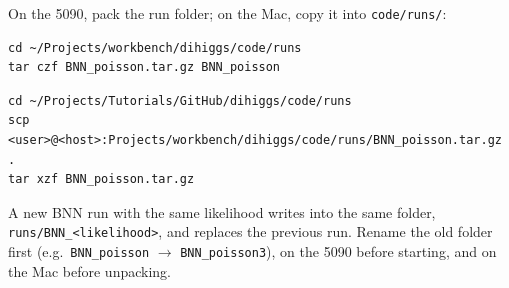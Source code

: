 \documentclass[11pt]{article}
\newcommand{\file}[1]{\nolinkurl{#1}}
\begin{document}
On the 5090, pack the run folder; on the Mac, copy it into \file{code/runs/}:
\begin{lstlisting}[style=sh]
cd ~/Projects/workbench/dihiggs/code/runs
tar czf BNN_poisson.tar.gz BNN_poisson
\end{lstlisting}
\begin{lstlisting}[style=sh]
cd ~/Projects/Tutorials/GitHub/dihiggs/code/runs
scp <user>@<host>:Projects/workbench/dihiggs/code/runs/BNN_poisson.tar.gz .
tar xzf BNN_poisson.tar.gz
\end{lstlisting}

\begin{watch}
A new BNN run with the same likelihood writes into the same folder,
\file{runs/BNN_<likelihood>}, and replaces the previous run. Rename the old folder first
(e.g.\ \file{BNN_poisson} $\to$ \file{BNN_poisson3}), on the 5090 before starting, and on
the Mac before unpacking.
\end{watch}
\end{document}
